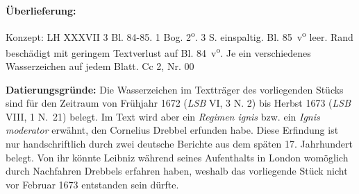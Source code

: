 \begin{ledgroupsized}[r]{120mm}%
\footnotesize%
\pstart%
\noindent\textbf{\"{U}berlieferung:}%
\pend%
\end{ledgroupsized}%
%
\begin{ledgroupsized}[r]{114mm}%
\footnotesize%
\pstart%
\parindent -6mm%
%
Konzept: LH XXXVII 3 Bl. 84-85.
1 Bog. 2\textsuperscript{o}. 3 S. einspaltig.
Bl. 85~v\textsuperscript{o} leer.
Rand beschädigt mit geringem Textverlust auf Bl. 84~v\textsuperscript{o}.
Je ein verschiedenes Wasserzeichen auf jedem Blatt.%
\newline%
Cc 2, Nr. 00%
\pend%
\end{ledgroupsized}%
%
\vspace*{5mm}%
\begin{ledgroup}%
\footnotesize%
\pstart%
\noindent%
\footnotesize{%
\textbf{Datierungsgr\"{u}nde:}
Die Wasserzeichen im Textträger des vorliegenden Stücks sind für den Zeit\-raum von Frühjahr 1672 (\cite{00257}\textit{LSB} VI, 3 N. 2) bis Herbst 1673 (\cite{00265}\textit{LSB} VIII, 1 N.~21) belegt.
Im Text wird aber ein \textit{Regimen ignis} bzw. ein \textit{Ignis moderator} erwähnt, den Cornelius Drebbel erfunden habe.
Diese Erfindung ist nur handschriftlich durch zwei deutsche Berichte aus dem späten 17. Jahrhundert belegt.
Von ihr könnte Leibniz während seines Aufenthalts in London womöglich durch Nachfahren Drebbels erfahren haben,
weshalb das vorliegende Stück nicht vor Februar 1673 entstanden sein dürfte. %
}%
\pend%
\end{ledgroup}%
%
\vspace*{8mm}%
\pstart
\noindent
[84~r\textsuperscript{o}]
\pend
\pstart%
\normalsize%
\noindent%
\centering%
